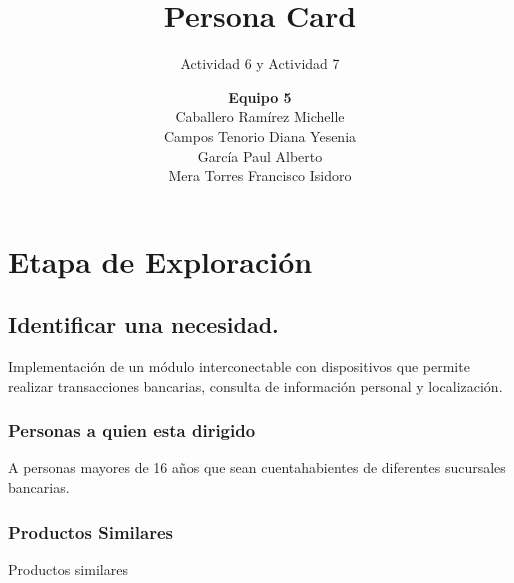 \documentclass[11pt]{book}
\title{Persona Card}
\author{\textbf{Equipo 5}\\Caballero Ramírez Michelle\\Campos Tenorio Diana Yesenia\\García Paul Alberto\\Mera Torres Francisco Isidoro}
\subtitle{Actividad 6 y Actividad 7}
\date{}
\begin{document}
	\maketitle
	\makeProjectCharter
	\makeFirmas
	\tableofcontents
\chapter{Etapa de Exploración}
	
	\section{Identificar una necesidad.}

	Implementación de un módulo interconectable con dispositivos que permite realizar transacciones bancarias, consulta de información personal y localización.
	
	\subsection{Personas a quien esta dirigido}

	A personas mayores de 16 años que sean cuentahabientes de diferentes sucursales bancarias.
	
	\subsection{Productos Similares}
	\begin{TablaGenerica}{Productos similares}
	\end{TablaGenerica}

\end{document}
